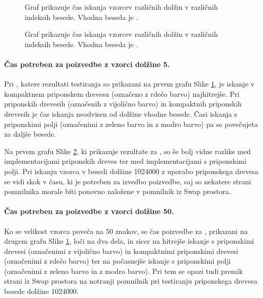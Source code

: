 \begin{figure}[htb]
    \centering
    
    \caption{Graf prikazuje čas iskanja vzorcev različnih dolžin v različnih indeksih besede. Vhodna beseda je \DNK.} 
    \label{fig:IskanjeGraf}
\end{figure}

\begin{figure}[htb]
    \centering
    
    \caption{Graf prikazuje čas iskanja vzorcev različnih dolžin v različnih indeksih besede. Vhodna beseda je \NK.} 
    \label{fig:IskanjeGrafSLO}
\end{figure}

\paragraph{Čas potreben za poizvedbe z vzorci dolžine 5.}

Pri \DNK, katere rezultati testiranja so prikazani na prvem grafu Slike \ref{fig:IskanjeGraf}, je iskanje v kompaktnem priponskem drevesu (označeno z rdečo barvo) najhitrejše. Pri priponskih drevesih (označenih z vijolično barvo) in kompaktnih priponskih drevesih je čas iskanja neodvisen od dolžine vhodne besede. Časi iskanja s priponskimi polji (označenimi z zeleno barvo in z modro barvo) pa se povečujeta za daljše besede.

Na prvem grafu Slike \ref{fig:IskanjeGrafSLO}, ki prikazuje rezultate za \NK, so še bolj vidne razlike med implementacijami priponskih dreves ter med implementacijami s priponskimi polji. Pri iskanju vzorca v besedi dolžine 1024000 z uporabo priponskega drevesa se vidi skok v času, ki je potreben za izvedbo poizvedbe, saj so nekatere strani pomnilnika morale biti ponovno naložene v pomnilnik iz Swap prostora.

\paragraph{Čas potreben za poizvedbe z vzorci dolžine 50.}

Ko se velikost vzorca poveča na 50 znakov, se čas poizvedbe za \DNK, prikazani na drugem grafu Slike \ref{fig:IskanjeGraf}, loči na dva dela, in sicer na hitrejše iskanje s priponskimi drevesi (označenimi z vijolično barvo) in kompaktnimi priponskimi drevesi (označenimi z rdečo barvo) ter na počasnejše iskanje s priponskimi polji (označenimi z zeleno barvo in z modro barvo). Pri tem se opazi tudi premik strani iz Swap prostora na notranji pomnilnik pri testiranju priponskega drevesa besede dolžine 1024000.

